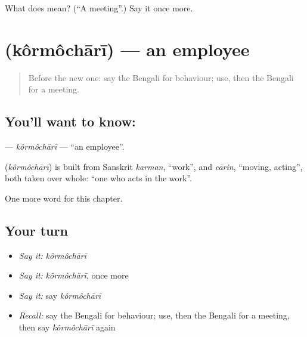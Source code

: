 \begin{tcolorbox}[breakable,colback=teal!4,colframe=teal!35!black,title={Before you move on}]
What does  mean? (\textquotedblleft{}A meeting\textquotedblright{}.) Say it once more.
\end{tcolorbox}
\section[\texorpdfstring{\bn{কর্মচারী} (kôrmôchārī)}{কর্মচারী (kôrmôchārī)}]{ (kôrmôchārī) — an employee}

\label{lesson:BN-C235-kormochari}



\begin{quote}
Before the new one: say the Bengali for behaviour; use, then the Bengali for a meeting.
\end{quote}

\subsection*{You'll want to know: }
\textbf{} — \emph{kôrmôchārī} — \textquotedblleft{}an employee\textquotedblright{}.

\begin{cousinweb}
\textbf{} (\emph{kôrmôchārī}) is built from Sanskrit \emph{karman}, \textquotedblleft{}work\textquotedblright{}, and \emph{cārin}, \textquotedblleft{}moving, acting\textquotedblright{}, both taken over whole: \textquotedblleft{}one who acts in the work\textquotedblright{}.
\end{cousinweb}

\begin{grammarlens}[title={What you've built}]
One more word for this chapter.
\end{grammarlens}

\subsection*{Your turn}
\begin{itemize}
\raggedright
  \item \emph{Say it:} \emph{kôrmôchārī}
  \item \emph{Say it:} \emph{kôrmôchārī}, once more
  \item \emph{Say it:} say \emph{kôrmôchārī}
  \item \emph{Recall:} say the Bengali for behaviour; use, then the Bengali for a meeting, then say \emph{kôrmôchārī} again
\end{itemize}

